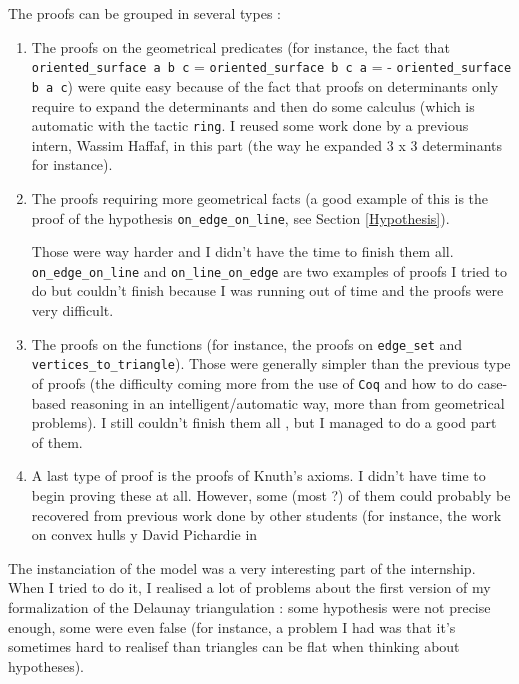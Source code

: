 \documentclass[a4paper,10pt]{article}
\begin{document}
The proofs can be grouped in several types :
\begin{enumerate}
\item The proofs on the geometrical predicates (for instance, the fact that {\tt oriented\_surface a b c} = {\tt oriented\_surface b c a} = {- \tt oriented\_surface b a c}) were quite easy because of the fact that proofs on determinants only require to expand the determinants and then do some calculus (which is automatic with the tactic {\tt ring}. I reused some work done by a previous intern, Wassim Haffaf, in this part (the way he expanded 3 x 3 determinants for instance).
\item The proofs requiring more geometrical facts (a good example of this is the proof of the hypothesis {\tt on\_edge\_on\_line}, see Section \ref{Hypothesis}).

  Those were way harder and I didn't have the time to finish them all. {\tt on\_edge\_on\_line} and {\tt on\_line\_on\_edge} are two examples of proofs I tried to do but couldn't finish because I was running out of time and the proofs were very difficult.
  \item The proofs on the functions (for instance, the proofs on {\tt edge\_set} and {\tt vertices\_to\_triangle}). Those were generally simpler than the previous type of proofs (the difficulty coming more from the use of {\tt Coq} and how to do case-based reasoning in an intelligent/automatic way, more than from geometrical problems). I still couldn't finish them all , but I managed to do a good part of them. 

    \item A last type of proof is the proofs of Knuth's axioms. I didn't have time to begin proving these at all. However, some (most ?) of them could probably be recovered from previous work done by other students (for instance, the work on convex hulls y David Pichardie in \cite{Hull}
  \end{enumerate}

  The instanciation of the model was a very interesting part of the internship. When I tried to do it, I realised a lot of problems about the first version of my formalization of the Delaunay triangulation : some hypothesis were not precise enough, some were even false (for instance, a problem I had was that it's sometimes hard to realisef than triangles can be flat when thinking about hypotheses).


\newpage
\end{document}
